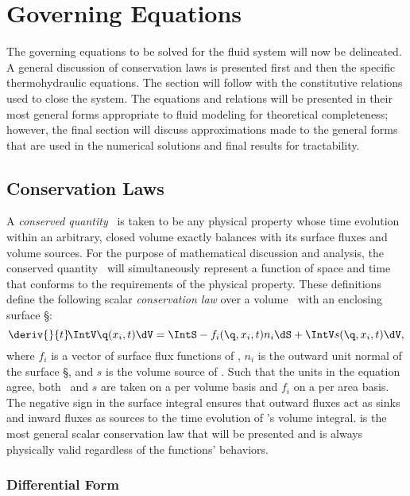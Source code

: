 \section{Governing Equations}\label{Section:GoverningEquations}

The governing equations to be solved for the fluid system will now be delineated.
A general discussion of conservation laws is presented first and then the specific thermohydraulic equations.
The section will follow with the constitutive relations used to close the system.
The equations and relations will be presented in their most general forms appropriate to fluid modeling for theoretical completeness; however, the final section will discuss approximations made to the general forms that are used in the numerical solutions and final results for tractability.


\subsection{Conservation Laws}\label{CLawDefinition}

A \textit{conserved quantity} \q\ is taken to be any physical property whose time evolution within an arbitrary, closed volume exactly balances with its surface fluxes and volume sources.
For the purpose of mathematical discussion and analysis, the conserved quantity \q\ will simultaneously represent a function of space and time that conforms to the requirements of the physical property.
These definitions define the following scalar \textit{conservation law} over a volume \V\ with an enclosing surface \S:
\begin{equation}
    \deriv{}{t}\!  \IntV \q(x_i,t) \dV = \IntS -f_i(\q,x_i,t) n_i\dS + \IntV s(\q,x_i,t) \dV,
    \label{Eqn:GeneralIntegralCLaw}
\end{equation}
where $f_i$ is a vector of surface flux functions of \q, $n_i$ is the outward unit normal of the surface \S, and $s$ is the volume source of \q.
Such that the units in the equation agree, both \q\ and $s$ are taken on a per volume basis and $f_i$ on a per area basis.
The negative sign in the surface integral ensures that outward fluxes act as sinks and inward fluxes as sources to the time evolution of \q's volume integral.
 is the most general scalar conservation law that will be presented and is always physically valid regardless of the functions' behaviors.


\subsubsection{Differential Form}

